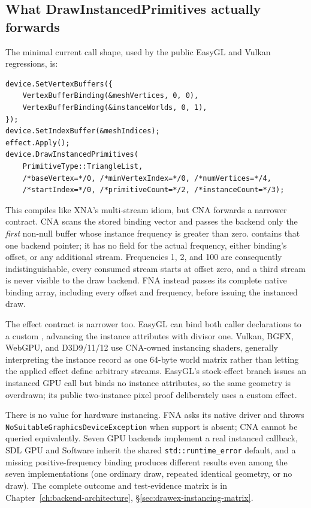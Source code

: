 \subsection{What DrawInstancedPrimitives actually forwards}
\label{sec:graphicsdevice-instancing}

The minimal current call shape, used by the public EasyGL and Vulkan regressions, is:

\begin{lstlisting}
device.SetVertexBuffers({
    VertexBufferBinding(&meshVertices, 0, 0),
    VertexBufferBinding(&instanceWorlds, 0, 1),
});
device.SetIndexBuffer(&meshIndices);
effect.Apply();
device.DrawInstancedPrimitives(
    PrimitiveType::TriangleList,
    /*baseVertex=*/0, /*minVertexIndex=*/0, /*numVertices=*/4,
    /*startIndex=*/0, /*primitiveCount=*/2, /*instanceCount=*/3);
\end{lstlisting}

This compiles like XNA's multi-stream idiom, but CNA forwards a narrower contract.
CNA scans the stored binding vector and passes the backend only the \emph{first} non-null
buffer whose instance frequency is greater than zero.  contains that one
backend pointer; it has no field for the actual frequency, either binding's offset, or any
additional stream. Frequencies 1,
2, and 100 are consequently indistinguishable, every consumed stream starts at offset zero,
and a third stream is never visible to the draw backend. FNA instead passes its complete
native binding array, including every offset and frequency, before issuing the instanced draw.

The effect contract is narrower too. EasyGL can bind both caller declarations to a custom
, advancing the instance attributes with divisor one. Vulkan, BGFX,
WebGPU, and D3D9/11/12 use CNA-owned instancing shaders, generally interpreting the instance
record as one 64-byte world matrix rather than letting the applied effect define arbitrary
streams. EasyGL's stock-effect branch issues an instanced GPU call but binds no instance
attributes, so the same geometry is overdrawn; its public two-instance pixel proof
deliberately uses a custom effect.

There is no  value for hardware instancing. FNA asks its native
driver and throws \texttt{NoSuitableGraphicsDeviceException} when support is absent; CNA
cannot be queried equivalently. Seven GPU backends implement a real instanced callback,
SDL GPU and Software inherit the shared \texttt{std::runtime\_error} default, and a missing
positive-frequency binding produces different results even among the seven implementations
(one ordinary draw, repeated identical geometry, or no draw). The complete outcome and
test-evidence matrix is in Chapter~\ref{ch:backend-architecture},
\S\ref{sec:drawex-instancing-matrix}.

